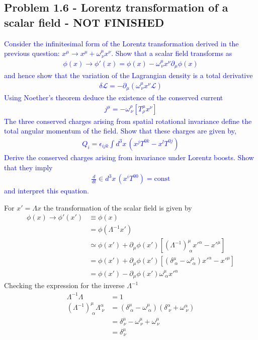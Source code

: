 \documentclass[../main.tex]{subfiles}
\begin{document}
\subsection{Problem 1.6 - Lorentz transformation of a scalar field - NOT FINISHED}

\textcolor{blue}{
Consider the infinitesimal form of the Lorentz transformation derived in the previous question: $x^\mu\rightarrow x^\mu+\omega^\mu_{\,\nu}x^\nu$. Show that a scalar field transforms as
\begin{align}
\phi(x)\rightarrow\phi'(x)=\phi(x)-\omega^\mu_{\,\nu}x^\nu\partial_\mu\phi(x)
\end{align}
and hence show that the variation of the Lagrangian density is a total derivative
\begin{align}
\delta\mathcal{L}=-\partial_\mu(\omega^\mu_{\,\nu}x^\nu\mathcal{L})
\end{align}
Using Noether’s theorem deduce the existence of the conserved current
\begin{align}
j^\mu=-\omega^\rho_{\,\nu}[T^\mu_\rho x^\nu]
\end{align}
The three conserved charges arising from spatial rotational invariance define the total
angular momentum of the field. Show that these charges are given by,
\begin{align}
Q_i=\epsilon_{ijk}\int d^3x\,(x^jT^{0k}-x^lT^{0j})
\end{align}
Derive the conserved charges arising from invariance under Lorentz boosts. Show that
they imply
\begin{align}
\frac{d}{dt}\in d^3x\,(x^iT^{00})=\text{const}
\end{align}
and interpret this equation.
}\newline

For $x'=\Lambda x$ the transformation of the scalar field is given by
\begin{align}
\phi(x)\rightarrow\phi'(x')
&\equiv\phi(x)\\
&=\phi(\Lambda^{-1}x')\\
&\simeq\phi(x')+\partial_\mu\phi(x')[(\Lambda^{-1})^\mu_{\;\alpha}x'^\alpha-x'^\mu]\\
&=\phi(x')+\partial_\mu\phi(x')[(\delta^\mu_{\;\alpha}-\omega^\mu_{\;\alpha})x'^\alpha-x'^\mu]\\
&=\phi(x')-\partial_\mu\phi(x')\omega^\mu_{\;\alpha}x'^\alpha
\end{align}
Checking the expression for the inverse $\Lambda^{-1}$
\begin{align}
\Lambda^{-1}\Lambda&=1\\
(\Lambda^{-1})^\mu_{\;\alpha}\Lambda^\alpha_{\;\nu}&=(\delta^\mu_{\;\alpha}-\omega^\mu_{\;\alpha})(\delta^\alpha_{\;\nu}+\omega^\alpha_{\;\nu})\\
&=\delta^\mu_{\,\nu}-\omega^\mu_{\,\nu}+\omega^\mu_{\,\nu}\\
&=\delta^\mu_{\,\nu}
\end{align}
\end{document}
